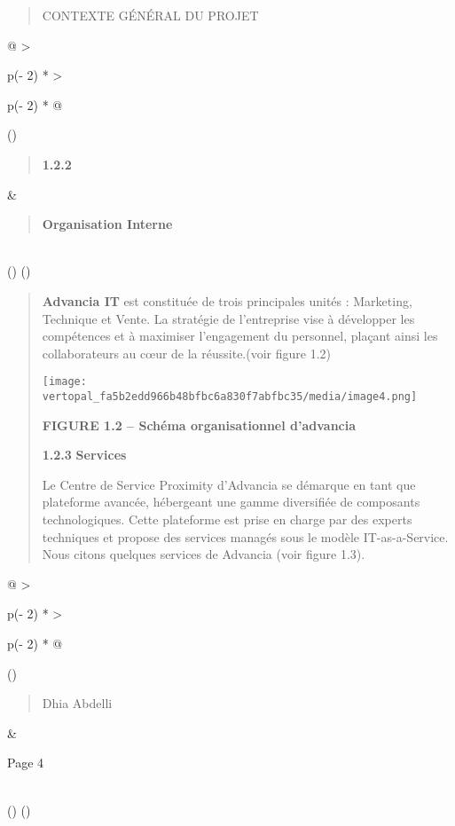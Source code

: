 \documentclass[
]{article}
\begin{document}
\begin{quote}
CONTEXTE GÉNÉRAL DU PROJET
\end{quote}

\begin{longtable}[]{@{}
  >{\raggedright\arraybackslash}p{(\columnwidth - 2\tabcolsep) * }
  >{\raggedright\arraybackslash}p{(\columnwidth - 2\tabcolsep) * }@{}}
\toprule()
\begin{minipage}[b]{\linewidth}\raggedright
\begin{quote}
\textbf{1.2.2}
\end{quote}
\end{minipage} & \begin{minipage}[b]{\linewidth}\raggedright
\begin{quote}
\textbf{Organisation Interne}
\end{quote}
\end{minipage} \\
\midrule()
\endhead
\bottomrule()
\end{longtable}

\begin{quote}
\textbf{Advancia IT} est constituée de trois principales unités :
Marketing, Technique et Vente. La stratégie de l'entreprise vise à
développer les compétences et à maximiser l'engagement du personnel,
plaçant ainsi les collaborateurs au cœur de la réussite.(voir figure
1.2)

\texttt{[image: vertopal\_fa5b2edd966b48bfbc6a830f7abfbc35/media/image4.png]}

\textbf{FIGURE 1.2 -- Schéma organisationnel d'advancia}

\textbf{1.2.3} \textbf{Services}

Le Centre de Service Proximity d'Advancia se démarque en tant que
plateforme avancée, hébergeant une gamme diversifiée de composants
technologiques. Cette plateforme est prise en charge par des experts
techniques et propose des services managés sous le modèle
IT-as-a-Service. Nous citons quelques services de Advancia (voir figure
1.3).
\end{quote}

\begin{longtable}[]{@{}
  >{\raggedright\arraybackslash}p{(\columnwidth - 2\tabcolsep) * }
  >{\raggedright\arraybackslash}p{(\columnwidth - 2\tabcolsep) * }@{}}
\toprule()
\begin{minipage}[b]{\linewidth}\raggedright
\begin{quote}
Dhia Abdelli
\end{quote}
\end{minipage} & \begin{minipage}[b]{\linewidth}\raggedright
Page 4
\end{minipage} \\
\midrule()
\endhead
\bottomrule()
\end{longtable}
\end{document}
